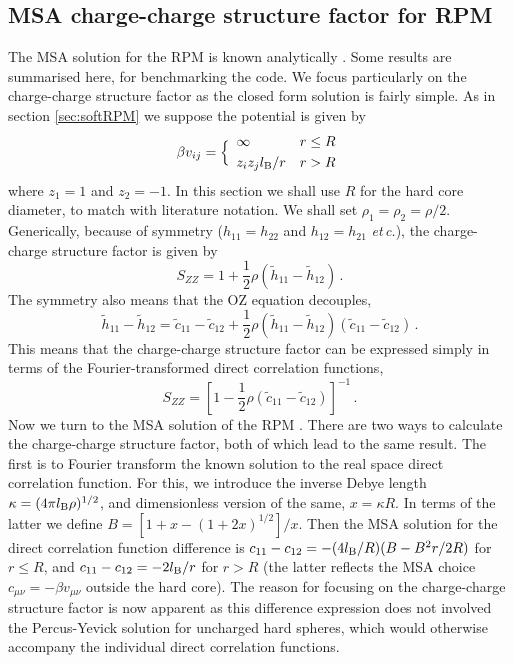 \documentclass[12pt,a4paper]{article}
\newcommand{\latin}[1]{\emph{#1}}
\newcommand{\etc}{\latin{et\,c.}}
\begin{document}
\subsection{MSA charge-charge structure factor for RPM}
%
The MSA solution for the RPM is known analytically \cite{WL72}.  Some
results are summarised here, for benchmarking the code.  We
focus particularly on the charge-charge structure factor as the closed
form solution is fairly simple.  As in section \ref{sec:softRPM} we
suppose the potential is given by
%
\begin{equation}
  \beta v_{ij}=\Bigl\{\begin{array}{ll}
  \infty & r\le R\\[3pt]
  z_iz_jl_{\mathrm{B}}/r & r>R
  \end{array}
\end{equation}
%
where $z_1=1$ and $z_2=-1$. In this section we shall use $R$ for the
hard core diameter, to match with literature notation.  We shall set
$\rho_1=\rho_2=\rho/2$.  Generically, because of symmetry
($h_{11}=h_{22}$ and $h_{12}=h_{21}$ \etc), the charge-charge
structure factor is given by
%
\begin{equation}
  S_{ZZ}=1+{\textstyle\frac{1}{2}}\rho(\tilde h_{11}-\tilde h_{12})\,.
\end{equation}
%
The symmetry also means that the OZ equation decouples,
%
\begin{equation}
  \tilde h_{11}-\tilde h_{12}=
  \tilde c_{11}-\tilde c_{12} + 
  {\textstyle\frac{1}{2}}\rho(\tilde h_{11}-\tilde h_{12})
  (\tilde c_{11}-\tilde c_{12})\,.
\end{equation}
%
This means that the charge-charge structure factor can be expressed
simply in terms of the Fourier-transformed direct correlation functions,
%
\begin{equation}
  S_{ZZ}=[1-{\textstyle\frac{1}{2}}\rho(\tilde c_{11}-\tilde c_{12})]^{-1}\,.
\end{equation}
%
Now we turn to the MSA solution of the RPM \cite{WL72}.  There are two
ways to calculate the charge-charge structure factor, both of which
lead to the same result.  The first is to Fourier transform the known
solution to the real space direct correlation function.  For this, we
introduce the inverse Debye length $\kappa=(4\pi l_{\mathrm{B}}\rho)^{1/2}$, and
dimensionless version of the same, $x=\kappa R$.  In terms of the
latter we define $B=[1+x-(1+2x)^{1/2}]/x$.  Then the MSA solution for
the direct correlation function difference is
$c_{11}-c_{12}=-({4l_{\mathrm{B}}}/{R})(B-{B^2 r}/{2R})$ for $r\le R$, and
$c_{11}-c_{12}= -{2l_{\mathrm{B}}}/{r}$ for $r > R$ (the latter reflects the MSA
choice $c_{\mu\nu}=-\beta v_{\mu\nu}$ outside the hard core).  The
reason for focusing on the charge-charge structure factor is now
apparent as this difference expression does not involved the
Percus-Yevick solution for uncharged hard spheres, which would
otherwise accompany the individual direct correlation functions.
\end{document}

